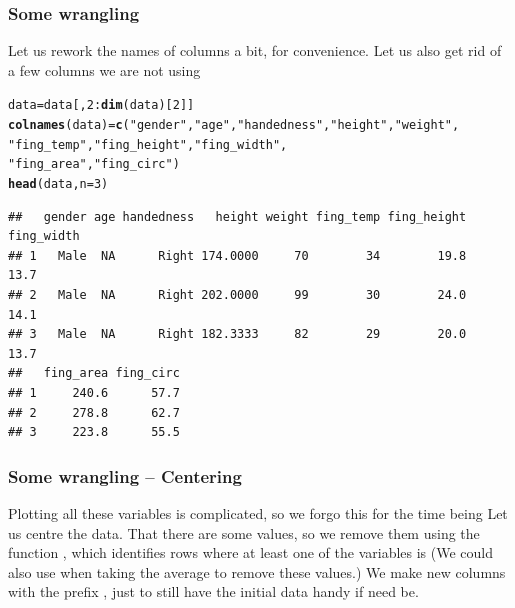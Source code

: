 \documentclass[aspectratio=169]{beamer}\usepackage[]{graphicx}\usepackage[]{xcolor}
\makeatletter
\newcommand{\hlnum}[1]{\textcolor[rgb]{0.686,0.059,0.569}{#1}}%
\newcommand{\hlsng}[1]{\textcolor[rgb]{0.192,0.494,0.8}{#1}}%
\newcommand{\hlopt}[1]{\textcolor[rgb]{0,0,0}{#1}}%
\newcommand{\hldef}[1]{\textcolor[rgb]{0.345,0.345,0.345}{#1}}%
\newcommand{\hlkwb}[1]{\textcolor[rgb]{0.69,0.353,0.396}{#1}}%
\newcommand{\hlkwc}[1]{\textcolor[rgb]{0.333,0.667,0.333}{#1}}%
\newcommand{\hlkwd}[1]{\textcolor[rgb]{0.737,0.353,0.396}{\textbf{#1}}}%
\newenvironment{kframe}{%
 \def\at@end@of@kframe{}%
 \ifinner\ifhmode%
  \def\at@end@of@kframe{\end{minipage}}%
  \begin{minipage}{\columnwidth}%
 \fi\fi%
 \def\FrameCommand##1{\hskip\@totalleftmargin \hskip-\fboxsep
 \colorbox{shadecolor}{##1}\hskip-\fboxsep
     \hskip-\linewidth \hskip-\@totalleftmargin \hskip\columnwidth}%
 \MakeFramed {\advance\hsize-\width
   \@totalleftmargin\z@ \linewidth\hsize
   \@setminipage}}%
 {\par\unskip\endMakeFramed%
 \at@end@of@kframe}
\newenvironment{knitrout}{}{} %
\makeatother
\begin{document}
\begin{frame}[fragile]\frametitle{Some wrangling}
Let us rework the names of columns a bit, for convenience. Let us also get rid of a few columns we are not using
\vfill
\begin{knitrout}
\color{fgcolor}\begin{kframe}
\begin{alltt}
\hldef{data} \hlkwb{=} \hldef{data[,}\hlnum{2}\hlopt{:}\hlkwd{dim}\hldef{(data)[}\hlnum{2}\hldef{]]}
\hlkwd{colnames}\hldef{(data)} \hlkwb{=} \hlkwd{c}\hldef{(}\hlsng{"gender"}\hldef{,} \hlsng{"age"}\hldef{,} \hlsng{"handedness"}\hldef{,} \hlsng{"height"}\hldef{,} \hlsng{"weight"}\hldef{,}
                  \hlsng{"fing_temp"}\hldef{,} \hlsng{"fing_height"}\hldef{,} \hlsng{"fing_width"}\hldef{,}
                  \hlsng{"fing_area"}\hldef{,} \hlsng{"fing_circ"}\hldef{)}
\hlkwd{head}\hldef{(data,} \hlkwc{n}\hldef{=}\hlnum{3}\hldef{)}
\end{alltt}
\begin{verbatim}
##   gender age handedness   height weight fing_temp fing_height fing_width
## 1   Male  NA      Right 174.0000     70        34        19.8       13.7
## 2   Male  NA      Right 202.0000     99        30        24.0       14.1
## 3   Male  NA      Right 182.3333     82        29        20.0       13.7
##   fing_area fing_circ
## 1     240.6      57.7
## 2     278.8      62.7
## 3     223.8      55.5
\end{verbatim}
\end{kframe}
\end{knitrout}
\end{frame}



\begin{frame}\frametitle{Some wrangling -- Centering}
Plotting all these variables is complicated, so we forgo this for the time being
\vfill
Let us centre the data. That there are some  values, so we remove them using the function , which identifies rows where at least one of the variables is 
\vfill
(We could also use  when taking the average to remove these values.) 
\vfill
We make new columns with the prefix , just to still have the initial data handy if need be.
\end{frame}
\end{document}
